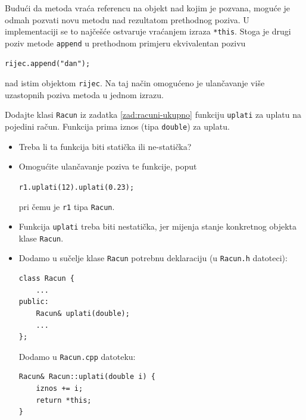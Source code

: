 Budući da metoda vraća referencu na objekt nad kojim je pozvana, moguće je odmah pozvati novu metodu nad rezultatom prethodnog poziva. U implementaciji se to najčešće ostvaruje vraćanjem izraza \texttt{*this}. Stoga je drugi poziv metode \texttt{append} u prethodnom primjeru ekvivalentan pozivu

\begin{verbatim}
rijec.append("dan");
\end{verbatim}

nad istim objektom \texttt{rijec}. Na taj način omogućeno je ulančavanje više uzastopnih poziva metoda u jednom izrazu.


\begin{zadatak}
    Dodajte klasi \texttt{Racun} 
    iz zadatka \ref{zad:racuni-ukupno} 
    funkciju \texttt{uplati} za uplatu na pojedini račun. 
    Funkcija prima iznos (tipa \texttt{double}) za uplatu.
    \begin{itemize}
        \item[(a)]
        Treba li ta funkcija biti statička ili ne-statička?
        \item[(b)]
        Omogućite ulančavanje poziva te funkcije, poput
        \begin{center}
            \texttt{r1.uplati(12).uplati(0.23);}
        \end{center}
        pri čemu je \texttt{r1} tipa \texttt{Racun}.
    \end{itemize}
\end{zadatak}


\begin{rjesenje}
    \begin{itemize}
        \item[(a)]
        Funkcija \texttt{uplati} treba biti nestatička, jer mijenja stanje konkretnog objekta klase \texttt{Racun}.

        \item[(b)]
        Dodamo u sučelje klase \texttt{Racun}
        potrebnu deklaraciju (u \texttt{Racun.h} datoteci):
        \medskip

        \begin{verbatim}
class Racun {
    ...
public:
    Racun& uplati(double);
    ...
};
        \end{verbatim}
        \medskip

        Dodamo u \texttt{Racun.cpp} datoteku:
        \medskip

        \begin{verbatim}
Racun& Racun::uplati(double i) {
    iznos += i;
    return *this;
}
        \end{verbatim}
    \end{itemize}
\end{rjesenje}


